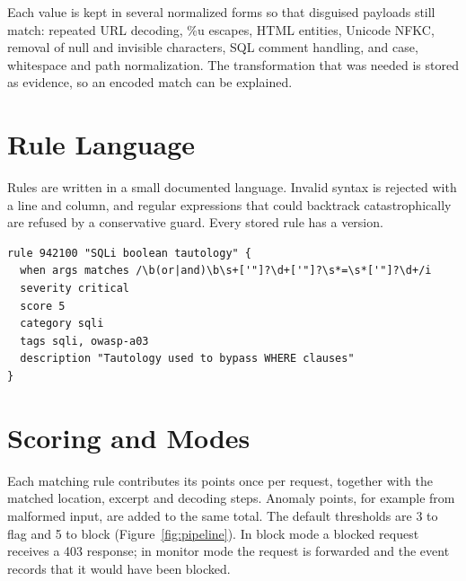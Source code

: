 \documentclass{FastFyp}
\begin{document}
Each value is kept in several normalized forms so that disguised payloads still match: repeated URL decoding, \%u escapes, HTML entities, Unicode NFKC, removal of null and invisible characters, SQL comment handling, and case, whitespace and path normalization. The transformation that was needed is stored as evidence, so an encoded match can be explained.

\section{Rule Language}
Rules are written in a small documented language. Invalid syntax is rejected with a line and column, and regular expressions that could backtrack catastrophically are refused by a conservative guard. Every stored rule has a version.

{\small\singlespacing
\begin{verbatim}
rule 942100 "SQLi boolean tautology" {
  when args matches /\b(or|and)\b\s+['"]?\d+['"]?\s*=\s*['"]?\d+/i
  severity critical
  score 5
  category sqli
  tags sqli, owasp-a03
  description "Tautology used to bypass WHERE clauses"
}
\end{verbatim}}

\section{Scoring and Modes}
Each matching rule contributes its points once per request, together with the matched location, excerpt and decoding steps. Anomaly points, for example from malformed input, are added to the same total. The default thresholds are 3 to flag and 5 to block (Figure~\ref{fig:pipeline}). In block mode a blocked request receives a 403 response; in monitor mode the request is forwarded and the event records that it would have been blocked.
\end{document}
